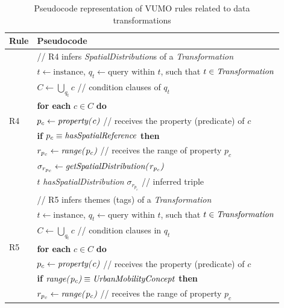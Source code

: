 \documentclass[]{interact}
\theoremstyle{plain}%
\theoremstyle{definition}
\theoremstyle{remark}
\theoremstyle{definition}
\begin{document}
\begin{tiny}
\begin{table}[htbp]
\caption{Pseudocode representation of VUMO rules related to data transformations}
\label{tab:vumorules_transformations}
\centering
\begin{tabular}{p{0.5cm}l}
    \toprule
    Rule & Pseudocode\\
    \midrule

	\multirow{9}{*}{R4} & // R4 infers \textit{SpatialDistribution}s of a \textit{Transformation}\\
	&  $t \leftarrow \text{instance}$, $q_t \leftarrow \text{query within } t$, such that $t \in \text{\textit{Transformation}}$ \\
	& $C \leftarrow \bigcup_{q_t} c$ // condition clauses of $q_t$\\
	&  \textbf{for each} $c \in C$ \textbf{do} \\
	& \quad $p_c \leftarrow \text{\textit{property(}}c\text{\textit{)}}$ // receives the property (predicate) of $c$ \\
	& \quad \textbf{if} $p_c \equiv \text{\textit{hasSpatialReference}}$ \textbf{then} \\
	& \quad \quad $r_{p_c} \leftarrow \text{\textit{range(}}p_c\text{\textit{)}}$ // receives the range of property $p_c$ \\
	& \quad \quad $\sigma_{r_{p_c}} \leftarrow \text{\textit{getSpatialDistribution(}}r_{p_c}\text{\textit{)}}$ \\
	& \quad \quad $t$ \textit{hasSpatialDistribution} $\sigma_{r_{p_c}}$ // inferred triple\\
	\hline
	\multirow{8}{*}{R5} & // R5 infers themes (tags) of a \textit{Transformation}\\
	&  $t \leftarrow \text{instance}$, $q_t \leftarrow \text{query within } t$, such that $t \in \text{\textit{Transformation}}$ \\
	& $C \leftarrow \bigcup_{q_t} c$ // condition clauses in $q_t$\\
	&  \textbf{for each} $c \in C$ \textbf{do} \\
	& \quad $p_c \leftarrow \text{\textit{property(}}c\text{\textit{)}}$ // receives the property (predicate) of $c$ \\
	& \quad \textbf{if} $\text{\textit{range(}}p_c\text{\textit{)}} \equiv \text{\textit{UrbanMobilityConcept}}$ \textbf{then} \\
	& \quad \quad $r_{p_c} \leftarrow \text{\textit{range(}}p_c\text{\textit{)}}$ // receives the range of property $p_c$ \\

\end{tabular}
\end{table}
\end{tiny}
\end{document}
